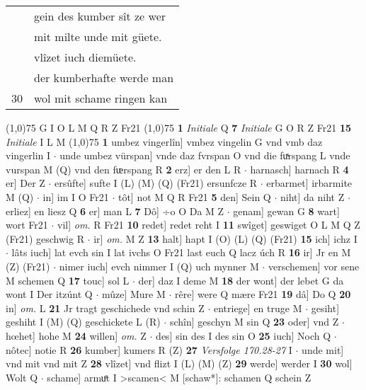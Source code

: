 \documentclass[8pt,a4paper,notitlepage]{article}
\begin{document}
\begin{table}[ht]
\begin{minipage}[t]{0.5\linewidth}
\begin{tabular}{rl}
 & gein des kumber sît ze wer\\ 
 & mit milte unde mit güete.\\ 
 & vlîzet iuch diemüete.\\ 
 & der kumberhafte werde man\\ 
30 & wol mit schame ringen kan\\ 
\end{tabular}
\scriptsize
\line(1,0){75} \newline
G I O L M Q R Z Fr21 \newline
\line(1,0){75} \newline
\textbf{1} \textit{Initiale} Q  \textbf{7} \textit{Initiale} G O R Z Fr21  \textbf{15} \textit{Initiale} I L M  \newline
\line(1,0){75} \newline
\textbf{1} umbez vingerlîn] vmbez vingelin G vnd vmb daz vingerlin I  $\cdot$ unde umbez vürspan] vnde daz fvrspan O vnd die fuͯrspang L vnde vurspan M (Q) vnd den fᵫrspang R \textbf{2} erz] er den L R  $\cdot$ harnasch] harnach R \textbf{4} er] Der Z  $\cdot$ ersûfte] sufte I (L) (M) (Q) (Fr21) ersunfcze R  $\cdot$ erbarmet] irbarmite M (Q)  $\cdot$ in] im I O Fr21  $\cdot$ tôt] not M Q R Fr21 \textbf{5} den] Sein Q  $\cdot$ niht] da niht Z  $\cdot$ erliez] en liesz Q \textbf{6} er] man L \textbf{7} Dô] ÷o O Da M Z  $\cdot$ genam] gewan G \textbf{8} wart] wort Fr21  $\cdot$ vil] \textit{om.} R Fr21 \textbf{10} redet] redet reht I \textbf{11} swîget] geswiget O L M Q Z (Fr21) geschwig R  $\cdot$ ir] \textit{om.} M Z \textbf{13} halt] hapt I (O) (L) (Q) (Fr21) \textbf{15} ich] ichz I  $\cdot$ lâts iuch] lat evch sin I lat ivchs O Fr21 last euch Q lacz úch R \textbf{16} ir] Jr en M (Z) (Fr21)  $\cdot$ nimer iuch] evch nimmer I (Q) uch mynner M  $\cdot$ verschemen] vor sene M schemen Q \textbf{17} touc] sol L  $\cdot$ der] daz I deme M \textbf{18} der wont] der lebet G da wont I Der itzúnt Q  $\cdot$ mûze] Mure M  $\cdot$ rêre] were Q mære Fr21 \textbf{19} dâ] Do Q \textbf{20} in] \textit{om.} L \textbf{21} Jr tragt geschichede vnd schin Z  $\cdot$ entriege] en truge M  $\cdot$ gesiht] geshiht I (M) (Q) geschickete L (R)  $\cdot$ schîn] geschyn M sin Q \textbf{23} oder] vnd Z  $\cdot$ hœhet] hohe M \textbf{24} willen] \textit{om.} Z  $\cdot$ des] sin des I des sin O \textbf{25} iuch] Noch Q  $\cdot$ nôtec] notie R \textbf{26} kumber] kumers R (Z) \textbf{27} \textit{Versfolge 170.28-27} I   $\cdot$ unde mit] vnd mit vnd mit Z \textbf{28} vlîzet] vnd flizt I (L) (M) (Z) \textbf{29} werde] werder I \textbf{30} wol] Wolt Q  $\cdot$ schame] armuͤt I >scamen< M [schaw*]: schamen Q schein Z \newline

\end{minipage}
\end{table}
\end{document}
